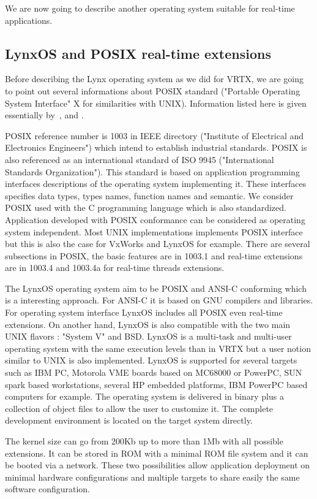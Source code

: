 \documentclass[10pt]{report}
\begin{document}
We are now going to describe another operating system suitable for real-time applications.

\subsection{LynxOS and POSIX real-time extensions}

Before describing the Lynx operating system as we did for VRTX, we are going to point out several informations about POSIX
standard ("Portable Operating System Interface" X for similarities with UNIX). Information listed here is given essentially
by~\cite{LYNX}, \cite{JMR:93} and \cite{JMR:94}.

POSIX reference number is 1003 in IEEE directory ("Institute of Electrical and Electronics Engineers") which intend to establish
industrial standards. POSIX is also referenced as an international standard of ISO 9945 ("International Standards Organization").
This standard is based on application programming interfaces descriptions of the operating system implementing it. These
interfaces specifies data types, types names, function names and semantic. We consider POSIX used with the C programming language
which is also standardized. Application developed with POSIX conformance can be considered as operating system independent.
Most UNIX implementations implements POSIX interface but this is also the case for VxWorks and LynxOS for example. There are
several subsections in POSIX, the basic features are in 1003.1 and real-time extensions are in 1003.4 and 1003.4a for real-time
threads extensions.

The LynxOS operating system aim to be POSIX and ANSI-C conforming which is a interesting approach. For ANSI-C it is based on
GNU compilers and libraries. For operating system interface LynxOS includes all POSIX even real-time extensions. On another
hand, LynxOS is also compatible with the two main UNIX flavors : "System V" and BSD. LynxOS is a multi-task and multi-user
operating system with the same execution levels than in VRTX but a user notion similar to UNIX is also implemented. LynxOS
is supported for several targets such as IBM PC, Motorola VME boards based on MC68000 or PowerPC, SUN spark based workstations,
several HP embedded platforms, IBM PowerPC based computers for example. The operating system is delivered in binary plus
a collection of object files to allow the user to customize it. The complete development environment is located on the
target system directly.

The kernel size can go from 200Kb up to more than 1Mb with all possible extensions. It can be stored in ROM with a minimal
ROM file system and it can be booted via a network. These two possibilities allow application deployment on minimal hardware
configurations and multiple targets to share easily the same software configuration.
\end{document}
